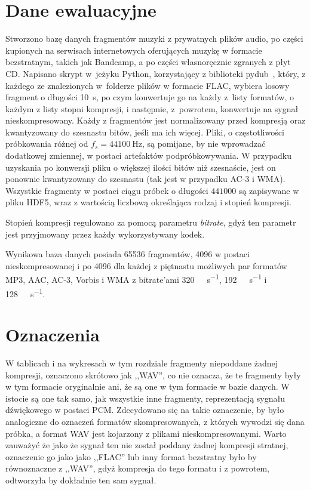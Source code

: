 \documentclass[pl,12pt]{aghdpl}
\let\Oldsection\section%
\renewcommand{\section}{\FloatBarrier\Oldsection}
\begin{document}
\section{Dane ewaluacyjne}
Stworzono bazę danych fragmentów muzyki z prywatnych plików audio, po
części kupionych na serwisach internetowych oferujących muzykę w formacie
bezstratnym, takich jak Bandcamp, a po części własnoręcznie zgranych z płyt
CD. Napisano skrypt w~jeżyku Python, korzystający z biblioteki
pydub~\cite{RobertPydub}, który,
z każdego ze znalezionych w~folderze plików w formacie FLAC, wybiera losowy
fragment o długości \SI{10}{\second}, po czym konwertuje go na każdy z~listy
formatów, o każdym z listy stopni kompresji, i następnie, z~powrotem, konwertuje
na sygnał nieskompresowany. Każdy z fragmentów jest normalizowany przed
kompresją oraz kwantyzowany do szesnastu bitów, jeśli ma ich więcej. Pliki,
o częstotliwości próbkowania różnej od $f_s = \SI{44100}{\hertz}$, są pomijane,
by nie wprowadzać dodatkowej zmiennej, w postaci artefaktów podpróbkowywania. W
przypadku uzyskania po konwersji pliku o większej ilości bitów niż szesnaście,
jest on ponownie kwantyzowany do szesnastu (tak jest w przypadku AC-3 i WMA).
Wszystkie fragmenty w postaci ciągu próbek o długości $441000$ są zapisywane w
pliku HDF5, wraz z wartością liczbową określająca rodzaj i stopień kompresji.  

Stopień kompresji regulowano za pomocą parametru \textit{bitrate}, gdyż ten
parametr jest przyjmowany przez każdy wykorzystywany kodek.

Wynikowa baza danych posiada 65536 fragmentów, 4096 w postaci
nieskompresowanej i po 4096 dla każdej z piętnastu możliwych par formatów MP3,
AAC, AC-3, Vorbis i WMA z bitrate'ami \SI{320}{\kibi\bit\per\second},
\SI{192}{\kibi\bit\per\second} i \SI{128}{\kibi\bit\per\second}.

\section{Oznaczenia}

W tablicach i na wykresach w tym rozdziale fragmenty niepoddane żadnej kompresji,
oznaczono skrótowo jak ,,WAV'', co nie oznacza, że te fragmenty były w tym
formacie oryginalnie ani, że są one w tym formacie w bazie danych. W istocie są
one tak samo, jak wszystkie inne fragmenty, reprezentacją sygnału dźwiękowego w
postaci PCM. Zdecydowano się na takie oznaczenie, by było analogiczne do
oznaczeń formatów skompresowanych, z których wywodzi się dana próbka, a
format WAV jest kojarzony z plikami nieskompresowanymi. Warto zauważyć że jako
że sygnał ten nie został poddany żadnej kompresji stratnej, oznaczenie go jako
jako ,,FLAC'' lub inny format bezstratny było by równoznaczne z ,,WAV'', gdyż
kompresja do tego formatu i z powrotem, odtworzyła by dokładnie ten sam sygnał.
\end{document}
